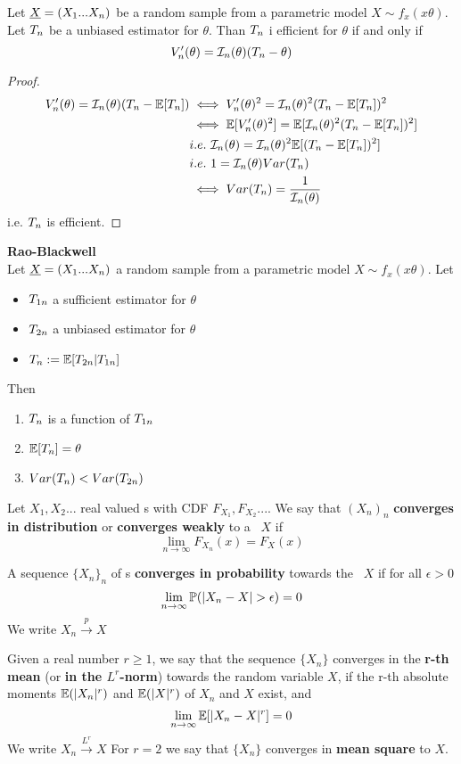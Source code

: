 \begin{prop}
	Let $\underline X=(X_1...X_n)$ be a random sample from a parametric model  $X\sim f_x(x\theta)$. Let $T_{n}$ be a unbiased estimator for $\theta$. Than $T_{n}$ i efficient for $\theta$ if and only if
	$$V_n'(\theta)=\mathcal{I}_n(\theta) (T_n-\theta)$$
\end{prop}
\begin{proof}
	\[
	\begin{split}
	V_n'(\theta)=\mathcal{I}_n(\theta) (T_{n}-\mathbb{E}[T_{n}])&
	\iff 	V_n'(\theta)^2=\mathcal{I}_n(\theta)^2 (T_{n}-\mathbb{E}[T_{n}])^2\\
	&\iff 	\mathbb{E}[V_n'(\theta)^2]=\mathbb{E}[\mathcal{I}_n(\theta)^2 (T_{n}-\mathbb{E}[T_{n}])^2]\\
	&i.e. \ \mathcal{I}_n(\theta)=\mathcal{I}_n(\theta)^2 \mathbb{E}[(T_{n}-\mathbb{E}[T_{n}])^2]\\
	&i.e. \ 1=\mathcal{I}_n(\theta) Var(T_{n})\\
	&\iff Var(T_{n})=\frac{1}{\mathcal{I}_n(\theta)}
	\end{split}
	\]
	i.e. $T_{n}$ is efficient.
\end{proof}
\begin{teo}
	\textbf{Rao-Blackwell}\\
	Let $\underline X=(X_1 ... X_n)$ a random sample from a parametric model  $X\sim f_x(x\theta)$. Let
	\begin{itemize}
		\item $T_{1n}$ a sufficient estimator for $\theta$
		\item $T_{2n}$ a unbiased estimator for $\theta$
		\item $T_{n}:=\mathbb{E}[T_{2n}|T_{1n}]$
	\end{itemize}
Then
\begin{enumerate}
	\item $T_{n}$ is a function of $T_{1n}$
	\item $\mathbb{E}[T_{n}]=\theta$
	\item $Var(T_{n})<Var(T_{2n})$
\end{enumerate}
\end{teo}

\begin{defi}
	Let $X_1, X_2...$ real valued  \rv s with CDF $F_{X_1},F_{X_2}...$. We say that $(X_n)_n$ \textbf{converges in distribution} or \textbf{converges weakly} to a \rv  \  $X$ if $$\lim_{n\to \infty}F_{X_n}(x)=F_X(x)$$
\end{defi}
\begin{defi}
	A sequence $\{ X_n\}_n$ of \rv s \textbf{converges in probability} towards the \rv \ $X$ if for all $\epsilon>0$
	$$\lim_{n\to \infty}\p(|X_n-X|>\epsilon)=0$$
	We write $X_n\xrightarrow{p}X$
\end{defi}
\begin{defi}
	Given a real number $r \geq 1$, we say that the sequence $\{X_n\}$ converges in the \textbf{r-th mean} (or \textbf{in the $L^r$-norm}) towards the random variable $X$, if the r-th absolute moments $\mathbb{E}(|X_n|^r)$ and $\mathbb{E}(|X|^r)$ of $X_n$ and $X$ exist, and
	$$\lim_{n\to \infty}\mathbb{E}[|X_n-X|^r]=0$$
	We write $X_n \xrightarrow{L^r} X$
	For $r=2$ we say that $\{X_n\}$ converges in \textbf{mean square}  to $X$.
\end{defi}

